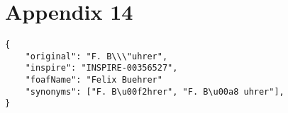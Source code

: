 \section*{Appendix 14}
\label{sec:app14}

\begin{lstlisting}
{
    "original": "F. B\\\"uhrer",
    "inspire": "INSPIRE-00356527", 
    "foafName": "Felix Buehrer"
    "synonyms": ["F. B\u00f2hrer", "F. B\u00a8 uhrer"], 
}

\end{lstlisting}
